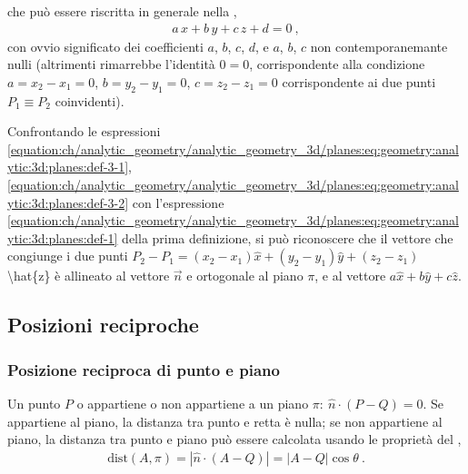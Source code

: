 \documentclass[letterpaper,10pt,italian]{jupyterBook}
\begin{document}
\sphinxAtStartPar
che può essere riscritta in generale nella ,
\begin{equation}\label{equation:ch/analytic_geometry/analytic_geometry_3d/planes:eq:geometry:analytic:3d:planes:def-3-2}
\begin{split}a \, x + b \, y + c \, z + d = 0 \ ,\end{split}
\end{equation}
\sphinxAtStartPar
con ovvio significato dei coefficienti \(a\), \(b\), \(c\), \(d\), e \(a\), \(b\), \(c\) non contemporanemante nulli (altrimenti rimarrebbe l’identità \(0 = 0\), corrispondente alla condizione \(a = x_2 - x_1 = 0\), \(b = y_2 - y_1 = 0\), \(c = z_2 - z_1 = 0\) corrispondente ai due punti \(P_1 \equiv P_2\) coinvidenti).

\sphinxAtStartPar
{} Confrontando le espressioni \eqref{equation:ch/analytic_geometry/analytic_geometry_3d/planes:eq:geometry:analytic:3d:planes:def-3-1}, \eqref{equation:ch/analytic_geometry/analytic_geometry_3d/planes:eq:geometry:analytic:3d:planes:def-3-2} con l’espressione \eqref{equation:ch/analytic_geometry/analytic_geometry_3d/planes:eq:geometry:analytic:3d:planes:def-1} della prima definizione, si può riconoscere che il vettore che congiunge i due punti \(P_2 - P_1 = (x_2 - x_1) \hat{x} + (y_2 - y_1) \hat{y} + (z_2 - z_1)\) \textbackslash{}hat\{z\} è allineato al vettore \(\vec{n}\) e ortogonale al piano \(\pi\), e al vettore \(a \hat{x} + b \hat{y} + c \hat{z}\).


\subsection{Posizioni reciproche}
\label{\detokenize{ch/analytic_geometry/analytic_geometry_3d/planes:posizioni-reciproche}}

\subsubsection{Posizione reciproca di punto e piano}
\label{\detokenize{ch/analytic_geometry/analytic_geometry_3d/planes:posizione-reciproca-di-punto-e-piano}}
\sphinxAtStartPar
Un punto \(P\) o appartiene o non appartiene a un piano \(\pi: \ \hat{n} \cdot (P - Q) = 0\). Se appartiene al piano, la distanza tra punto e retta è nulla; se non appartiene al piano, la distanza tra punto e piano può essere calcolata usando le proprietà
del {\hyperref[\detokenize{ch/algebra/vector-algebra-euclidean-space:math-hs-algebra-vector-euclidean-space-inner-product}]{}},
\begin{equation*}
\begin{split}\text{dist}(A,\pi) = \left| \hat{n} \cdot (A-Q) \right| = |A-Q| \cos \theta \ .\end{split}
\end{equation*}
\sphinxAtStartPar
{} 
\end{document}
